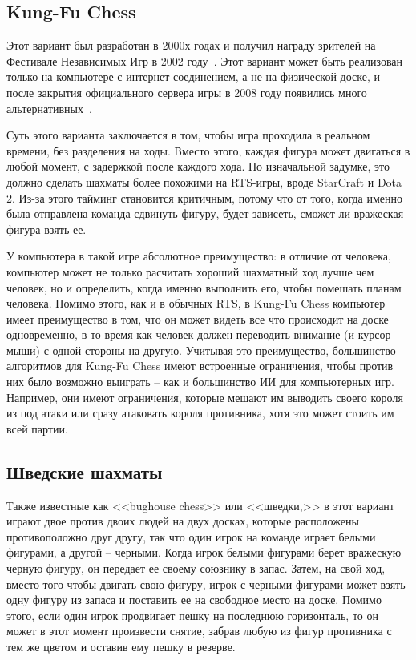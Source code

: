 \documentclass{article}
\begin{document}
\subsection{Kung-Fu Chess}

Этот вариант был разработан в 2000х годах
и получил награду зрителей на Фестивале Независимых Игр в 2002 году~\cite{igf-kungfuchess}.
Этот вариант может быть реализован только на компьютере с интернет-соединением,
а не на физической доске,
и после закрытия официального сервера игры в 2008 году
появились много альтернативных~\cite{kfchess}.

Суть этого варианта заключается в том, 
чтобы игра проходила в реальном времени,
без разделения на ходы. 
Вместо этого, каждая фигура может двигаться в любой момент,
с задержкой после каждого хода.
По изначальной задумке, это должно сделать шахматы более похожими на
RTS-игры, вроде StarCraft и Dota 2.
Из-за этого тайминг становится критичным,
потому что от того, когда именно была отправлена команда сдвинуть фигуру,
будет зависеть, сможет ли вражеская фигура взять ее.

У компьютера в такой игре абсолютное преимущество:
в отличие от человека, компьютер может не только расчитать хороший шахматный ход лучше чем человек,
но и определить, когда именно выполнить его, чтобы помешать планам человека.
Помимо этого, как и в обычных RTS, в Kung-Fu Chess
компьютер имеет преимущество в том, что он может видеть все что происходит на доске одновременно,
в то время как человек должен переводить внимание (и курсор мыши) с одной стороны на другую.
Учитывая это преимущество,
большинство алгоритмов для Kung-Fu Chess 
имеют встроенные ограничения,
чтобы против них было возможно выиграть -- 
как и большинство ИИ для компьютерных игр.
Например, они имеют ограничения,
которые мешают им выводить своего короля из под атаки
или сразу атаковать короля противника,
хотя это может стоить им всей партии.

\subsection{Шведские шахматы}

Также известные как <<bughouse chess>> или <<шведки,>>
в этот вариант играют двое против двоих людей на двух досках,
которые расположены противоположно друг другу,
так что один игрок на команде играет белыми фигурами, а другой -- черными.
Когда игрок белыми фигурами берет вражескую черную фигуру, он передает ее
своему союзнику в запас.
Затем, на свой ход, вместо того чтобы двигать свою фигуру,
игрок с черными фигурами может взять одну фигуру из запаса и поставить ее на свободное место на доске.
Помимо этого, если один игрок продвигает пешку на последнюю горизонталь,
то он может в этот момент произвести снятие, забрав любую из фигур противника с тем же цветом и оставив ему пешку в резерве.
\end{document}
